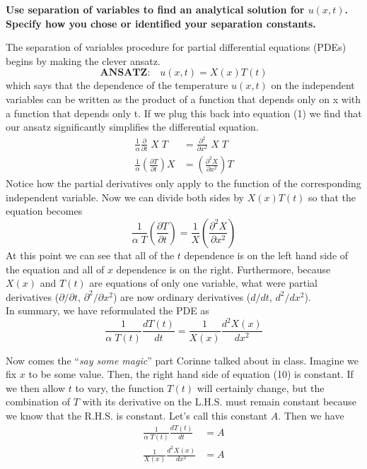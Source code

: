 \documentclass[a4paper, 11pt]{article}
\newenvironment{solution}{%
	\begin{list}{}{%
			\setlength{\topsep}{0pt}%
			\setlength{\leftmargin}{0.5cm}%
			\setlength{\rightmargin}{0.5cm}%
			\setlength{\listparindent}{\parindent}%
			\setlength{\itemindent}{\parindent}%
			\setlength{\parsep}{\parskip}%
		}%
		\item[]}{\end{list}}
\begin{document}
\begin{enumerate}[leftmargin=0em]
  \item \textbf{Use separation of variables to find an analytical solution for
      $u(x,t)$. Specify how you chose or identified your separation constants.}\\
    \begin{solution}
      The separation of variables procedure for partial differential equations
      (PDEs) begins by making the clever ansatz.
      \begin{equation}
        \textbf{ANSATZ:}\quad u(x,t) = X(x)T(t)
      \end{equation}
     which says that the dependence of the temperature $u(x,t)$ on the independent
     variables can be written as the product of a function that depends only
     on x with a function that depends only t.  If we plug this back into
     equation (1) we find that our ansatz significantly simplifies the
     differential equation.
     \begin{align}
       \frac{1}{\alpha}\frac{\partial}{\partial t}\;X\;T &= \frac{\partial^2}{\partial x^2}\;X\;T \\
       \frac{1}{\alpha}\left( \frac{\partial T}{\partial t} \right) X &= \left( \frac{\partial^2 X}{\partial x^2} \right) T
     \end{align}
    Notice how the partial derivatives only apply to the function of the
    corresponding independent variable. Now we can divide both sides by
    $X(x)T(t)$ so that the equation becomes 
    \begin{equation}
      \frac{1}{\alpha \; T}\left( \frac{\partial T}{\partial t} \right) = \frac{1}{X}\left( \frac{\partial^2 X}{\partial x^2} \right)
    \end{equation}
    At this point we can see that all of the $t$ dependence is on the left hand
    side of the equation and all of $x$ dependence is on the right. Furthermore,
    because $X(x)$ and $T(t)$ are equations of only one variable, what were
    partial derivatives ($\partial/\partial t$, $\partial^2 / \partial x^2$) are
    now ordinary derivatives ($d/dt$, $d^2/dx^2$). \\

    \noindent In summary, we have reformulated the PDE as
    \begin{equation}
      \frac{1}{\alpha \; T(t)}\frac{d T(t)}{dt} = \frac{1}{X(x)}\frac{d^2 X(x)}{dx^2}
    \end{equation}
    
    Now comes the ``\textit{say some magic}'' part Corinne talked about in class.
    Imagine we fix $x$ to be some value. Then, the right hand side of equation
    (10) is  constant. If we then allow $t$ to vary, the function $T(t)$ will
    certainly change, but the combination of $T$ with its derivative on the
    L.H.S. must remain constant because we know that the R.H.S. is constant. Let's call this constant $A$.
    Then we have
    \begin{align}
      \frac{1}{\alpha\; T(t)}\frac{d T(t)}{dt} &= A \\
      \frac{1}{X(x)}\frac{d^2 X(x)}{dx^2} &= A
    \end{align}


\end{solution}
\end{enumerate}
\end{document}
